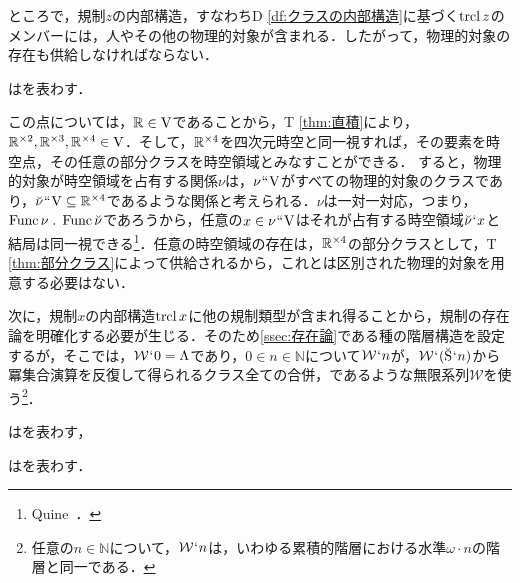 ところで，規制$ z $の内部構造，すなわちD \ref{df:クラスの内部構造}に基づく$ \operatorname{trcl} z $のメンバーには，人やその他の物理的対象が含まれる．したがって，物理的対象の存在も供給しなければならない．

\begin{df}
\label{df:クラスの内部構造}
\kagi{$
    \trcl\alpha
$}はを表わす．
\end{df}

\noindent この点については，$ \mathbb{R}\in\mathrm{V} $であることから，T \ref{thm:直積}により，$ \mathbb{R}^{\times 2},\mathbb{R}^{\times 3},\mathbb{R}^{\times 4}\in\mathrm{V} $．そして，$ \mathbb{R}^{\times 4} $を四次元時空と同一視すれば，その要素を時空点，その任意の部分クラスを時空領域とみなすことができる．
すると，物理的対象が時空領域を占有する関係$\nu$は，$\nu{\mspace{1mu}{``}\mspace{1mu}}\mathrm{V}$がすべての物理的対象のクラスであり，$\breve{\nu}{\mspace{1mu}{``}\mspace{1mu}}\mathrm{V}\subseteq\mathbb{R}^{\times 4}$であるような関係と考えられる．$\nu$は一対一対応，つまり，$ \func{\nu}\con{1}\func{\breve{\nu}} $であろうから，任意の$x\in\nu{\mspace{1mu}{``}\mspace{1mu}}\mathrm{V}$はそれが占有する時空領域$\breve{\nu}{\mspace{1mu}{`}\mspace{1mu}} x$と結局は同一視できる\footnote{
    Quine~\cite{Quine}．
}．任意の時空領域の存在は，$ \mathbb{R}^{\times 4} $の部分クラスとして，T \ref{thm:部分クラス}によって供給されるから，これとは区別された物理的対象を用意する必要はない．

次に，規制$x$の内部構造$\operatorname{trcl} x$に他の規制類型が含まれ得ることから，規制の存在論を明確化する必要が生じる．そのため\ref{ssec:存在論}である種の階層構造を設定するが，そこでは，$\mathcal{W}{\mspace{1mu}{`}\mspace{1mu}} 0 = \Lambda$であり，$ 0 \in n \in\mathbb{N}$について$\mathcal{W}{\mspace{1mu}{`}\mspace{1mu}} n$が，$\mathcal{W}{\mspace{1mu}{`}\mspace{1mu}} (\breve{\mathrm{S}}{\mspace{1mu}{`}\mspace{1mu}} n)$から冪集合演算を反復して得られるクラス全ての合併，であるような無限系列$\mathcal{W}$を使う\footnote{
    任意の$n\in\mathbb{N}$について，$ \mathcal{W}{\mspace{1mu}{`}\mspace{1mu}} n $は，いわゆる累積的階層における水準$ \omega\cdot n $の階層と同一である．
}．

\begin{df}
\label{df:冪集合演算}
はを表わす，
\end{df}

\begin{df}
\label{df:階層構造}
はを表わす．
\end{df}

